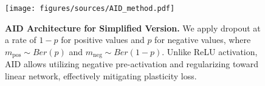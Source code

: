 

\begin{figure}[!t]
    \centering
    \texttt{[image: figures/sources/AID\_method.pdf]}
    \caption{\textbf{AID Architecture for Simplified Version.} We apply dropout at a rate of $1-p$ for positive values and $p$ for negative values, where $m_{\text{pos}} \sim Ber(p)$ and $m_{\text{neg}} \sim Ber(1-p)$. Unlike ReLU activation, AID allows utilizing negative pre-activation and regularizing toward linear network, effectively mitigating plasticity loss.}
    \label{fig:AID}
\end{figure}

